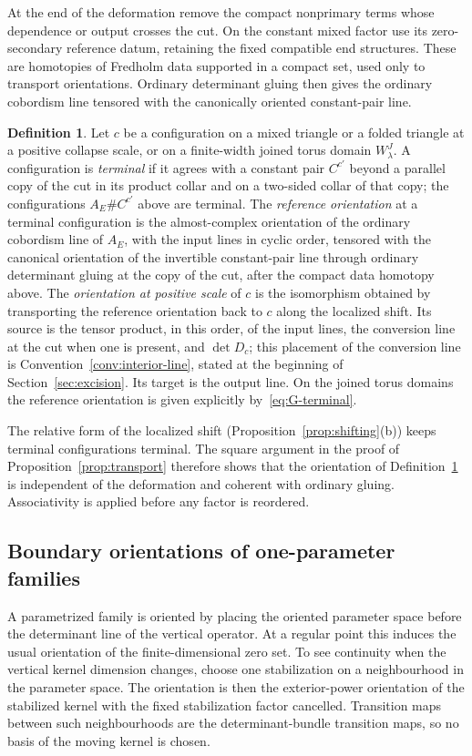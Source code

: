 \documentclass[11pt]{amsart}
\theoremstyle{definition}
\newtheorem{definition}[theorem]{Definition}
\theoremstyle{remark}
\theoremstyle{plain}
\numberwithin{equation}{section}
\begin{document}
At the end of the deformation remove the compact nonprimary terms
whose dependence or output crosses the cut. On the constant mixed
factor use its zero-secondary reference datum, retaining the fixed
compatible end structures. These are homotopies of Fredholm data
supported in a compact set, used only to transport orientations.
Ordinary determinant gluing then gives the ordinary cobordism line
tensored with the canonically oriented constant-pair line.

\begin{definition}\label{def:mixed-orientation}
Let $c$ be a configuration on a mixed triangle or a folded triangle
at a positive collapse scale, or on a finite-width joined torus domain
$W^J_\lambda$. A configuration is \emph{terminal} if it agrees with a
constant pair $C^{c'}$ beyond a parallel copy of the cut in its product
collar and on a two-sided collar of that copy; the configurations
$A_E\#C^{c'}$ above are terminal. The \emph{reference orientation} at
a terminal configuration is the almost-complex orientation of the
ordinary cobordism line of $A_E$, with the input lines in cyclic
order, tensored with the canonical orientation of the invertible
constant-pair line through ordinary determinant gluing at the copy of
the cut, after the compact data homotopy above. The \emph{orientation
at positive scale} of $c$ is the isomorphism obtained by
transporting the reference orientation back to $c$ along the
localized shift. Its source is the tensor product, in this order, of
the input lines, the conversion line at the cut when one is present,
and $\det D_c$; this placement of the conversion line is
Convention~\ref{conv:interior-line}, stated at the beginning of
Section~\ref{sec:excision}. Its target is the output line. On the joined torus domains the reference orientation is
given explicitly by~\eqref{eq:G-terminal}.
\end{definition}

The relative form of the localized shift
(Proposition~\ref{prop:shifting}(b)) keeps terminal configurations
terminal. The square argument in the proof of
Proposition~\ref{prop:transport} therefore shows that the orientation
of Definition~\ref{def:mixed-orientation} is independent of the
deformation and coherent with ordinary gluing. Associativity is
applied before any factor is reordered.

\subsection{Boundary orientations of one-parameter families}
A parametrized family is oriented by placing the oriented
parameter space before the determinant line of the vertical
operator. At a regular point this induces the usual
orientation of the finite-dimensional zero set. To see
continuity when the vertical kernel dimension changes,
choose one stabilization on a neighbourhood in the parameter
space. The orientation is then the exterior-power
orientation of the stabilized kernel with the fixed
stabilization factor cancelled. Transition maps between
such neighbourhoods are the determinant-bundle transition
maps, so no basis of the moving kernel is chosen.
\end{document}
